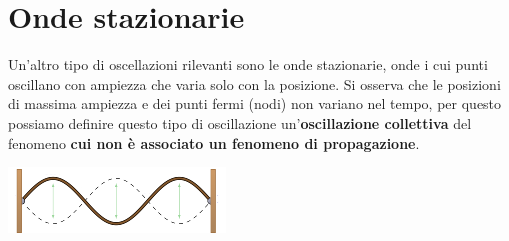 \documentclass[x11names]{report}
\begin{document}
	
	\newpage
	\section{Onde stazionarie}
	Un'altro tipo di oscellazioni rilevanti sono le onde stazionarie, onde i cui punti oscillano con ampiezza che varia solo con la posizione. Si osserva che le posizioni di massima ampiezza e dei punti fermi (nodi) non variano nel tempo, per questo possiamo definire questo tipo di oscillazione un'\textbf{oscillazione collettiva} del fenomeno \textbf{cui non è associato un fenomeno di propagazione}. \\
	
	\begin{center}
		\includegraphics{imgs/stazionarie.png}
	\end{center}
	
\end{document}
